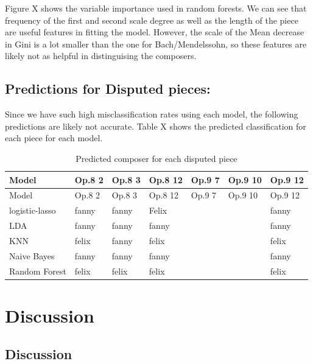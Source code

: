 \documentclass[12pt,twoside]{reedthesis}
\theoremstyle{definition}
\theoremstyle{definition}
\theoremstyle{definition}
\theoremstyle{remark}
\begin{document}
Figure X shows the variable importance used in random forests. We can
see that frequency of the first and second scale degree as well as the
length of the piece are useful features in fitting the model. However,
the scale of the Mean decrease in Gini is a lot smaller than the one for
Bach/Mendelssohn, so these features are likely not as helpful in
distinguising the composers.

\section{Predictions for Disputed
pieces:}\label{predictions-for-disputed-pieces}

Since we have such high misclassification rates using each model, the
following predictions are likely not accurate. Table X shows the
predicted classification for each piece for each model.
\begin{longtable}[]{@{}lllllll@{}}
\caption{Predicted composer for each disputed piece}\tabularnewline
\toprule
Model & Op.8 2 & Op.8 3 & Op.8 12 & Op.9 7 & Op.9 10 & Op.9
12\tabularnewline
\midrule
\endfirsthead
\toprule
Model & Op.8 2 & Op.8 3 & Op.8 12 & Op.9 7 & Op.9 10 & Op.9
12\tabularnewline
\midrule
\endhead
logistic-lasso & fanny & fanny & Felix & & & fanny\tabularnewline
LDA & fanny & fanny & fanny & & & fanny\tabularnewline
KNN & felix & fanny & felix & & & felix\tabularnewline
Naive Bayes & fanny & fanny & fanny & & & fanny\tabularnewline
Random Forest & felix & felix & felix & & & felix\tabularnewline
\bottomrule
\end{longtable}
\chapter{Discussion}\label{discussion}

\section{Discussion}\label{discussion-1}
\end{document}
